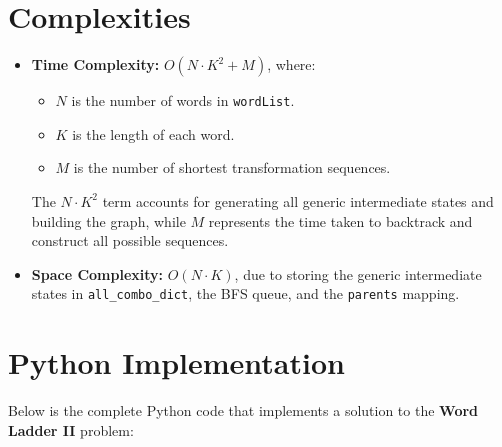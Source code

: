 \section*{Complexities}

\begin{itemize}
    \item \textbf{Time Complexity:} \(O(N \cdot K^2 + M)\), where:
    \begin{itemize}
        \item \(N\) is the number of words in \texttt{wordList}.
        \item \(K\) is the length of each word.
        \item \(M\) is the number of shortest transformation sequences.
    \end{itemize}
    The \(N \cdot K^2\) term accounts for generating all generic intermediate states and building the graph, while \(M\) represents the time taken to backtrack and construct all possible sequences.
    
    \item \textbf{Space Complexity:} \(O(N \cdot K)\), due to storing the generic intermediate states in \texttt{all\_combo\_dict}, the BFS queue, and the \texttt{parents} mapping.
\end{itemize}

\section*{Python Implementation}


Below is the complete Python code that implements a solution to the \textbf{Word Ladder II} problem:

